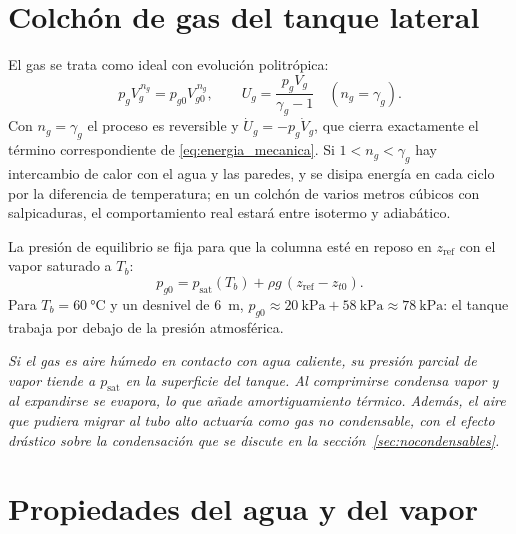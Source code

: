 \documentclass[11pt,a4paper]{article}
\newcommand{\psat}{p_{\mathrm{sat}}}
\newenvironment{nota}{\par\smallskip\noindent\begin{minipage}{\linewidth}\small\itshape}{\end{minipage}\par\smallskip}
\begin{document}
\section{Colchón de gas del tanque lateral}\label{sec:gas}

El gas se trata como ideal con evolución politrópica:
\begin{equation}
p_g V_g^{\,n_g} = p_{g0} V_{g0}^{\,n_g},\qquad U_g = \frac{p_g V_g}{\gamma_g - 1}\quad(n_g=\gamma_g).
\end{equation}
Con $n_g=\gamma_g$ el proceso es reversible y $\dot U_g = -p_g\dot V_g$, que cierra exactamente el término correspondiente de \eqref{eq:energia_mecanica}. Si $1<n_g<\gamma_g$ hay intercambio de calor con el agua y las paredes, y se disipa energía en cada ciclo por la diferencia de temperatura; en un colchón de varios metros cúbicos con salpicaduras, el comportamiento real estará entre isotermo y adiabático.

La presión de equilibrio se fija para que la columna esté en reposo en $z_{\mathrm{ref}}$ con el vapor saturado a $T_b$:
\begin{equation}
p_{g0} = \psat(T_b) + \rho g\,(z_{\mathrm{ref}} - z_{t0}) .
\end{equation}
Para $T_b=\SI{60}{\celsius}$ y un desnivel de \SI{6}{\metre}, $p_{g0}\approx\SI{20}{\kilo\pascal}+\SI{58}{\kilo\pascal}\approx\SI{78}{\kilo\pascal}$: el tanque trabaja por debajo de la presión atmosférica.

\begin{nota}
Si el gas es aire húmedo en contacto con agua caliente, su presión parcial de vapor tiende a $\psat$ en la superficie del tanque. Al comprimirse condensa vapor y al expandirse se evapora, lo que añade amortiguamiento térmico. Además, el aire que pudiera migrar al tubo alto actuaría como gas no condensable, con el efecto drástico sobre la condensación que se discute en la sección~\ref{sec:nocondensables}.
\end{nota}

\section{Propiedades del agua y del vapor}
\end{document}
